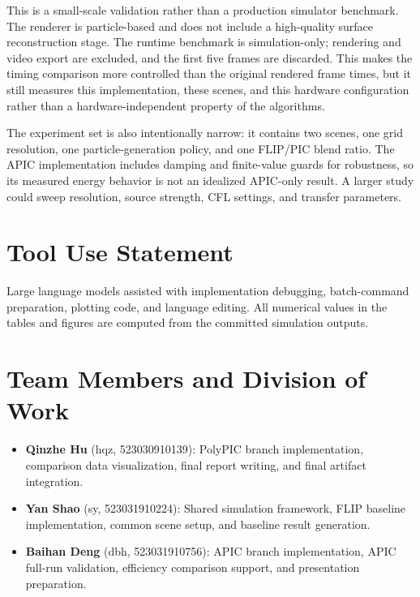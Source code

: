 \documentclass[conference]{IEEEtran}
\begin{document}
This is a small-scale validation rather than a production simulator benchmark. The renderer is particle-based and does not include a high-quality surface reconstruction stage. The runtime benchmark is simulation-only; rendering and video export are excluded, and the first five frames are discarded. This makes the timing comparison more controlled than the original rendered frame times, but it still measures this implementation, these scenes, and this hardware configuration rather than a hardware-independent property of the algorithms.

The experiment set is also intentionally narrow: it contains two scenes, one grid resolution, one particle-generation policy, and one FLIP/PIC blend ratio. The APIC implementation includes damping and finite-value guards for robustness, so its measured energy behavior is not an idealized APIC-only result. A larger study could sweep resolution, source strength, CFL settings, and transfer parameters.

\section*{Tool Use Statement}

Large language models assisted with implementation debugging, batch-command preparation, plotting code, and language editing. All numerical values in the tables and figures are computed from the committed simulation outputs.

\appendices
\section{Team Members and Division of Work}

\begin{itemize}
  \item \textbf{Qinzhe Hu} (hqz, 523030910139): PolyPIC branch implementation, comparison data visualization, final report writing, and final artifact integration.
  \item \textbf{Yan Shao} (sy, 523031910224): Shared simulation framework, FLIP baseline implementation, common scene setup, and baseline result generation.
  \item \textbf{Baihan Deng} (dbh, 523031910756): APIC branch implementation, APIC full-run validation, efficiency comparison support, and presentation preparation.
\end{itemize}
\end{document}
